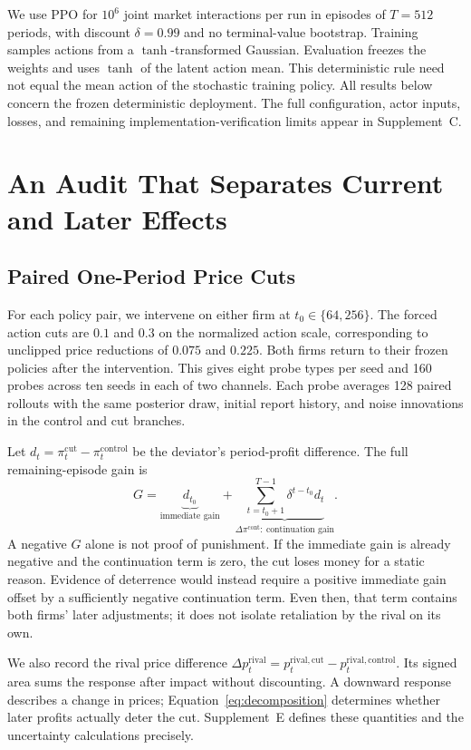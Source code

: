 \documentclass{article}
\begin{document}
We use PPO \citep{schulman2017proximal} for $10^6$ joint market interactions per run in episodes of $T=512$ periods, with discount $\delta=0.99$ and no terminal-value bootstrap. Training samples actions from a $\tanh$-transformed Gaussian. Evaluation freezes the weights and uses $\tanh$ of the latent action mean. This deterministic rule need not equal the mean action of the stochastic training policy. All results below concern the frozen deterministic deployment. The full configuration, actor inputs, losses, and remaining implementation-verification limits appear in Supplement~C.

\section{An Audit That Separates Current and Later Effects}

\subsection{Paired One-Period Price Cuts}

For each policy pair, we intervene on either firm at $t_0\in\{64,256\}$. The forced action cuts are $0.1$ and $0.3$ on the normalized action scale, corresponding to unclipped price reductions of $0.075$ and $0.225$. Both firms return to their frozen policies after the intervention. This gives eight probe types per seed and 160 probes across ten seeds in each of two channels. Each probe averages 128 paired rollouts with the same posterior draw, initial report history, and noise innovations in the control and cut branches.

Let $d_t=\pi_t^{\mathrm{cut}}-\pi_t^{\mathrm{control}}$ be the deviator's period-profit difference. The full remaining-episode gain is
\begin{equation}
G=\underbrace{d_{t_0}}_{\text{immediate gain}}+
\underbrace{\sum_{t=t_0+1}^{T-1}\delta^{t-t_0}d_t}_{\Delta\pi^{\mathrm{cont}}:\ \text{continuation gain}}.
\label{eq:decomposition}
\end{equation}
A negative $G$ alone is not proof of punishment. If the immediate gain is already negative and the continuation term is zero, the cut loses money for a static reason. Evidence of deterrence would instead require a positive immediate gain offset by a sufficiently negative continuation term. Even then, that term contains both firms' later adjustments; it does not isolate retaliation by the rival on its own.

We also record the rival price difference $\Delta p_t^{\mathrm{rival}}=p_t^{\mathrm{rival,cut}}-p_t^{\mathrm{rival,control}}$. Its signed area sums the response after impact without discounting. A downward response describes a change in prices; Equation~\eqref{eq:decomposition} determines whether later profits actually deter the cut. Supplement~E defines these quantities and the uncertainty calculations precisely.
\end{document}
